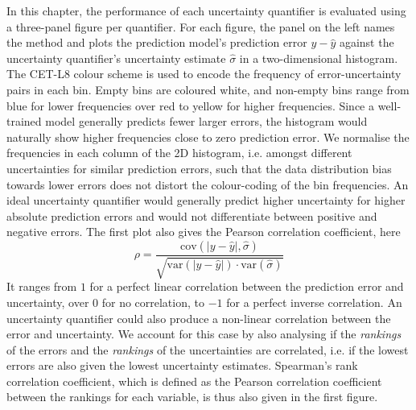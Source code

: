 \newpar In this chapter, the performance of each uncertainty quantifier is evaluated using a three-panel figure per quantifier. For each figure, the panel on the left names the method and plots the prediction model's prediction error $y - \hat{y}$ against the uncertainty quantifier's uncertainty estimate $\hat{\sigma}$ in a two-dimensional histogram. The CET-L8 colour scheme \cite{color-cet-2015, color-cet-2023} is used to encode the frequency of error-uncertainty pairs in each bin. Empty bins are coloured white, and non-empty bins range from blue for lower frequencies over red to yellow for higher frequencies. Since a well-trained model generally predicts fewer larger errors, the histogram would naturally show higher frequencies close to zero prediction error. We normalise the frequencies in each column of the 2D histogram, i.e. amongst different uncertainties for similar prediction errors, such that the data distribution bias towards lower errors does not distort the colour-coding of the bin frequencies. An ideal uncertainty quantifier would generally predict higher uncertainty for higher absolute prediction errors and would not differentiate between positive and negative errors. The first plot also gives the Pearson correlation coefficient, here
\begin{equation*}
    \rho = \frac{\text{cov}(|y - \hat{y}|, \hat{\sigma})}{\sqrt{\text{var}(|y-\hat{y}|) \cdot \text{var}(\hat{\sigma})}}
\end{equation*}
It ranges from $1$ for a perfect linear correlation between the prediction error and uncertainty, over $0$ for no correlation, to $-1$ for a perfect inverse correlation. An uncertainty quantifier could also produce a non-linear correlation between the error and uncertainty. We account for this case by also analysing if the \textit{rankings} of the errors and the \textit{rankings} of the uncertainties are correlated, i.e. if the lowest errors are also given the lowest uncertainty estimates. Spearman's rank correlation coefficient, which is defined as the Pearson correlation coefficient between the rankings for each variable, is thus also given in the first figure.

